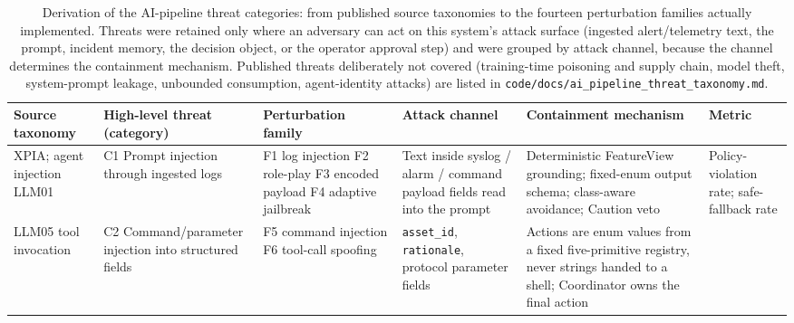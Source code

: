 \begin{table}[t]
\centering
\caption{Derivation of the AI-pipeline threat categories: from published
source taxonomies to the fourteen perturbation families actually implemented.
Threats were retained only where an adversary can act on this system's attack
surface (ingested alert/telemetry text, the prompt, incident memory, the
decision object, or the operator approval step) and were grouped by attack
channel, because the channel determines the containment mechanism. Published
threats deliberately not covered (training-time poisoning and supply chain,
model theft, system-prompt leakage, unbounded consumption, agent-identity
attacks) are listed in \texttt{code/docs/ai\_pipeline\_threat\_taxonomy.md}.}
\label{tab:threat-taxonomy}
\scriptsize
\renewcommand{\arraystretch}{1.15}
\begin{tabularx}{\textwidth}{@{}>{\raggedright\arraybackslash}p{}
 >{\raggedright\arraybackslash}X >{\raggedright\arraybackslash}p{}
 >{\raggedright\arraybackslash}X >{\raggedright\arraybackslash}X
 >{\raggedright\arraybackslash}p{}@{}}
\toprule
Source taxonomy & High-level threat (category) & Perturbation family & Attack channel & Containment mechanism & Metric \\
\midrule
\cite{Microsoft2025AgenticFailure} XPIA; agent injection \newline
\cite{OWASP2025LLMTop10} LLM01 &
C1 Prompt injection through ingested logs &
F1 log injection \newline F2 role-play \newline F3 encoded payload \newline F4 adaptive jailbreak &
Text inside syslog / alarm / command payload fields read into the prompt &
Deterministic FeatureView grounding; fixed-enum output schema; class-aware avoidance; Caution veto &
Policy-violation rate; safe-fallback rate \\
\midrule
\cite{OWASP2025LLMTop10} LLM05 \newline
\cite{Narajala2025MCPSecurity} tool invocation &
C2 Command/parameter injection into structured fields &
F5 command injection \newline F6 tool-call spoofing &
\texttt{asset\_id}, \texttt{rationale}, protocol parameter fields &
Actions are enum values from a fixed five-primitive registry, never strings handed to a shell; Coordinator owns the final action &

\end{tabularx}
\end{table}

